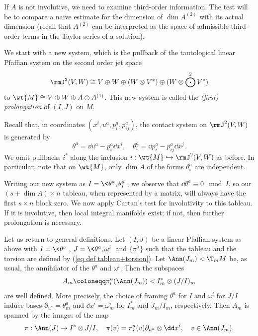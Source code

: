 \begin{example}
    If $A$ is not involutive, we need to examine third-order information. The test will be to compare a naive estimate for the dimension of $\dim A^{(2)}$ with its actual dimension (recall that $A^{(2)}$ can be interpreted as the space of admissible third-order terms in the Taylor series of a solution). 

    We start with a new system, which is the pullback of the tautological linear Pfaffian system on the second order jet space 
    \[\rmJ^2(V,W)\cong V\oplus W\oplus (W\otimes V^\ast)\oplus (W\otimes \bigodot^2 V^\ast)\]
    to $\wt{M}\cong V\oplus W\oplus A\oplus A^{(1)}$. This new system is called the \emph{(first) prolongation} of $(I,J)$ on $M$.

    Recall that, in coordinates $(x^i,u^a,p^a_i,p^a_{ij})$, the contact system on $\rmJ^2(V,W)$ is generated by 
    \[\theta^a=\dd u^a-p^a_i\dd x^i,\quad \theta^a_i=\dd p^a_i-p^a_{ij}\dd x^j.\]
    We omit pullbacks $i^\ast$ along the inclusion $i:\wt{M}\hookrightarrow \rmJ^2(V,W)$ as before. In particular, note that on $\wt{M}$, only $\dim A$ of the forms $\theta^a_i$ are independent. 

    Writing our new system as $I=\<\theta^a,\theta^a_i\>$, we observe that $\dd\theta^a\equiv 0\mod{I}$, so our $(s+\dim A)\times n$ tableau, when represented by a matrix, will always have the first $s\times n$ block zero. We now apply Cartan's test for involutivity to this tableau. If it is involutive, then local integral manifolds exist; if not, then further prolongation is necessary.
\end{example}


Let us return to general definitions. Let $(I,J)$ be a linear Pfaffian system as above with $I=\<\theta^a\>$, $J=\<\theta^a,\omega^i\>$ and $\{\pi^\lambda\}$ such that the tableau and the torsion are defined by (\ref{eq def tableau+torsion}). Let $\Ann(J_m)<\T_m M$ be, as usual, the annihilator of the $\theta^a$ and $\omega^i$. Then the subspaces 
\[A_m\coloneqq \pi^a_i(\Ann(J_m))<I_m^\ast\otimes (J\slash I)_m\] 
are well defined. More precisely, the choice of framing $\theta^a$ for $I$ and $\omega^i$ for $J\slash I$ induce bases $\partial_{u^a}=\theta^a_m$ and $\dd x^i=\omega^i_m$ for $I_m^\ast$ and $J_m\slash I_m$, respectively. Then $A_m$ is spanned by the images of the map
\[\pi:\Ann(J)\to I^\ast\otimes J\slash I,\quad \pi(v)=\pi^a_i(v)\partial_{u^a}\otimes\dd x^i,\quad v\in \Ann(J_m).\label{eq iv.60 Bryant}\]

